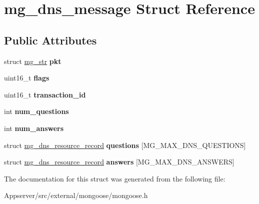 \hypertarget{structmg__dns__message}{}\section{mg\+\_\+dns\+\_\+message Struct Reference}
\label{structmg__dns__message}
\subsection*{Public Attributes}
\begin{DoxyCompactItemize}
\item 
struct \hyperlink{structmg__str}{mg\+\_\+str} {\bfseries pkt}\hypertarget{structmg__dns__message_ae8543b2a3044c785b4bf0dc4fc39beff}{}\label{structmg__dns__message_ae8543b2a3044c785b4bf0dc4fc39beff}

\item 
uint16\+\_\+t {\bfseries flags}\hypertarget{structmg__dns__message_a87f916bb55651d46ce74f930a5e08327}{}\label{structmg__dns__message_a87f916bb55651d46ce74f930a5e08327}

\item 
uint16\+\_\+t {\bfseries transaction\+\_\+id}\hypertarget{structmg__dns__message_afb4a01337779347f74a214c7a273ebcb}{}\label{structmg__dns__message_afb4a01337779347f74a214c7a273ebcb}

\item 
int {\bfseries num\+\_\+questions}\hypertarget{structmg__dns__message_a035ced22ef43b6b23ad6df3ad3aad126}{}\label{structmg__dns__message_a035ced22ef43b6b23ad6df3ad3aad126}

\item 
int {\bfseries num\+\_\+answers}\hypertarget{structmg__dns__message_a6ebecefbdcb5c292f439123b7c780517}{}\label{structmg__dns__message_a6ebecefbdcb5c292f439123b7c780517}

\item 
struct \hyperlink{structmg__dns__resource__record}{mg\+\_\+dns\+\_\+resource\+\_\+record} {\bfseries questions} \mbox{[}M\+G\+\_\+\+M\+A\+X\+\_\+\+D\+N\+S\+\_\+\+Q\+U\+E\+S\+T\+I\+O\+NS\mbox{]}\hypertarget{structmg__dns__message_a866a83825f2daa4043aa20acded4f007}{}\label{structmg__dns__message_a866a83825f2daa4043aa20acded4f007}

\item 
struct \hyperlink{structmg__dns__resource__record}{mg\+\_\+dns\+\_\+resource\+\_\+record} {\bfseries answers} \mbox{[}M\+G\+\_\+\+M\+A\+X\+\_\+\+D\+N\+S\+\_\+\+A\+N\+S\+W\+E\+RS\mbox{]}\hypertarget{structmg__dns__message_a76e7c9d2d5f7f621df2d2551f0163e01}{}\label{structmg__dns__message_a76e7c9d2d5f7f621df2d2551f0163e01}

\end{DoxyCompactItemize}


The documentation for this struct was generated from the following file\+:\begin{DoxyCompactItemize}
\item 
Appserver/src/external/mongoose/mongoose.\+h\end{DoxyCompactItemize}
